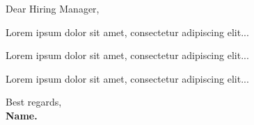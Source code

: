 \documentclass[a4paper,11pt]{letter}
\begin{document}

\normalsize Dear Hiring Manager,

\small \noindent
Lorem ipsum dolor sit amet, consectetur adipiscing elit...

\vspace{1pt}
Lorem ipsum dolor sit amet, consectetur adipiscing elit...

\vspace{1pt}
Lorem ipsum dolor sit amet, consectetur adipiscing elit...

\bigskip
\noindent
Best regards,\\
\textbf{Name.}
\end{document}
